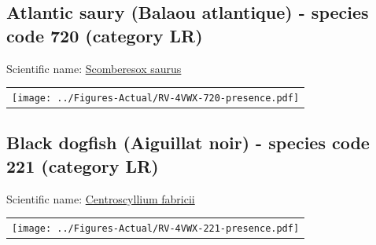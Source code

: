 \documentclass[12pt]{article}\usepackage[]{graphicx}\usepackage[]{color}
\begin{document}
\setcounter{figure}{0}

\hypertarget{sec:720}{%
\subsection{Atlantic saury (Balaou atlantique) - species code 720 (category LR)}\label{sec:720}}

  


Scientific name: \href{http://www.marinespecies.org/aphia.php?p=taxdetails\&id=126392}{Scomberesox saurus} \newline
\begin{minipage}{1.0\textwidth}
 \begin{tabular}{c}
\texttt{[image: ../Figures-Actual/RV-4VWX-720-presence.pdf]} \\ 
\end{tabular} 
\end{minipage}
\clearpage

\renewcommand\thefigure{\thesubsection\Alph{figure}}

\setcounter{figure}{0}

\hypertarget{sec:221}{%
\subsection{Black dogfish (Aiguillat noir) - species code 221 (category LR)}\label{sec:221}}

  


Scientific name: \href{http://www.marinespecies.org/aphia.php?p=taxdetails\&id=105906}{Centroscyllium fabricii} \newline
\begin{minipage}{1.0\textwidth}
 \begin{tabular}{c}
\texttt{[image: ../Figures-Actual/RV-4VWX-221-presence.pdf]} \\ 
\end{tabular} 
\end{minipage}
\clearpage

\renewcommand\thefigure{\thesubsection\Alph{figure}}

\setcounter{figure}{0}
\end{document}
